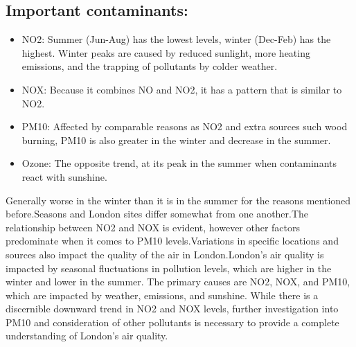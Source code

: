\documentclass{article}
\begin{document}
		\subsection{Important contaminants:}
	\begin{itemize}
		\item NO2: Summer (Jun-Aug) has the lowest levels, winter (Dec-Feb) has the highest. Winter peaks are caused by reduced sunlight, more heating emissions, and the trapping of pollutants by colder weather.
		\item NOX: Because it combines NO and NO2, it has a pattern that is similar to NO2.
		\item PM10: Affected by comparable reasons as NO2 and extra sources such wood burning, PM10 is also greater in the winter and decrease in the summer.
		\item Ozone: The opposite trend, at its peak in the summer when contaminants react with sunshine.
	\end{itemize}
	
	Generally worse in the winter than it is in the summer for the reasons mentioned before.Seasons and London sites differ somewhat from one another.The relationship between NO2 and NOX is evident, however other factors predominate when it comes to PM10 levels.Variations in specific locations and sources also impact the quality of the air in London.London's air quality is impacted by seasonal fluctuations in pollution levels, which are higher in the winter and lower in the summer. The primary causes are NO2, NOX, and PM10, which are impacted by weather, emissions, and sunshine. While there is a discernible downward trend in NO2 and NOX levels, further investigation into PM10 and consideration of other pollutants is necessary to provide a complete understanding of London's air quality.
	
	\newpage
	\printbibliography
\end{document}

